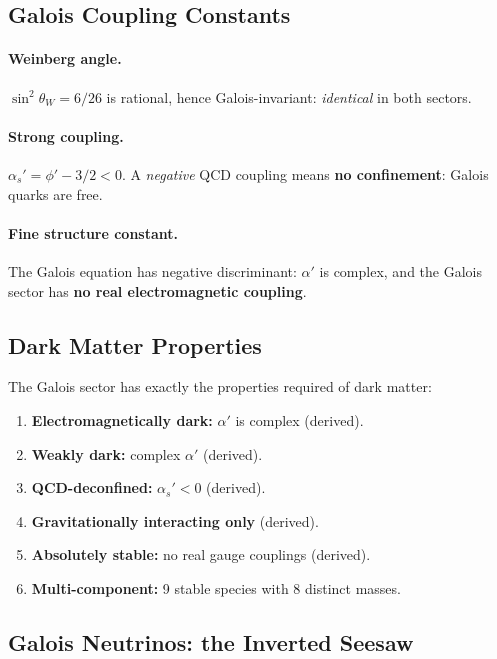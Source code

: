 \documentclass[12pt,a4paper]{article}
\theoremstyle{definition}
\begin{document}
\subsection{Galois Coupling Constants}

\paragraph{Weinberg angle.}  $\sin^2\theta_W = 6/26$ is rational, hence Galois-invariant: \emph{identical} in both sectors.

\paragraph{Strong coupling.}  $\alpha_s' = \phi' - 3/2 < 0$.  A \emph{negative} QCD coupling means \textbf{no confinement}: Galois quarks are free.

\paragraph{Fine structure constant.}  The Galois equation has negative discriminant: $\alpha'$ is complex, and the Galois sector has \textbf{no real electromagnetic coupling}.

\subsection{Dark Matter Properties}

The Galois sector has exactly the properties required of dark matter:
\begin{enumerate}
\item \textbf{Electromagnetically dark:} $\alpha'$ is complex (derived).
\item \textbf{Weakly dark:} complex $\alpha'$ (derived).
\item \textbf{QCD-deconfined:} $\alpha_s' < 0$ (derived).
\item \textbf{Gravitationally interacting only} (derived).
\item \textbf{Absolutely stable:} no real gauge couplings (derived).
\item \textbf{Multi-component:} 9 stable species with 8 distinct masses.
\end{enumerate}

\subsection{Galois Neutrinos: the Inverted Seesaw}
\end{document}
